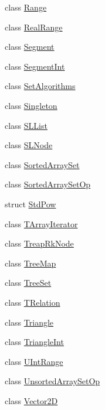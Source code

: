 \begin{DoxyCompactItemize}
\item 
class \hyperlink{class_designar_1_1_range}{Range}
\item 
class \hyperlink{class_designar_1_1_real_range}{Real\+Range}
\item 
class \hyperlink{class_designar_1_1_segment}{Segment}
\item 
class \hyperlink{class_designar_1_1_segment_int}{Segment\+Int}
\item 
class \hyperlink{class_designar_1_1_set_algorithms}{Set\+Algorithms}
\item 
class \hyperlink{class_designar_1_1_singleton}{Singleton}
\item 
class \hyperlink{class_designar_1_1_s_l_list}{S\+L\+List}
\item 
class \hyperlink{class_designar_1_1_s_l_node}{S\+L\+Node}
\item 
class \hyperlink{class_designar_1_1_sorted_array_set}{Sorted\+Array\+Set}
\item 
class \hyperlink{class_designar_1_1_sorted_array_set_op}{Sorted\+Array\+Set\+Op}
\item 
struct \hyperlink{struct_designar_1_1_std_pow}{Std\+Pow}
\item 
class \hyperlink{class_designar_1_1_t_array_iterator}{T\+Array\+Iterator}
\item 
class \hyperlink{class_designar_1_1_treap_rk_node}{Treap\+Rk\+Node}
\item 
class \hyperlink{class_designar_1_1_tree_map}{Tree\+Map}
\item 
class \hyperlink{class_designar_1_1_tree_set}{Tree\+Set}
\item 
class \hyperlink{class_designar_1_1_t_relation}{T\+Relation}
\item 
class \hyperlink{class_designar_1_1_triangle}{Triangle}
\item 
class \hyperlink{class_designar_1_1_triangle_int}{Triangle\+Int}
\item 
class \hyperlink{class_designar_1_1_u_int_range}{U\+Int\+Range}
\item 
class \hyperlink{class_designar_1_1_unsorted_array_set_op}{Unsorted\+Array\+Set\+Op}
\item 
class \hyperlink{class_designar_1_1_vector2_d}{Vector2D}
\end{DoxyCompactItemize}
